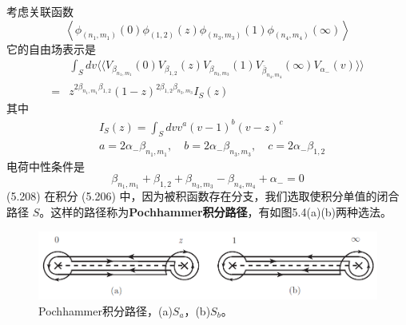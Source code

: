 考虑关联函数
\begin{equation}
	\left\langle\phi_{\left(n_{1}, m_{1}\right)}(0) \phi_{(1,2)}(z) \phi_{\left(n_{3}, m_{3}\right)}(1) \phi_{\left(n_{4}, m_{4}\right)}(\infty)\right\rangle 
\end{equation}
它的自由场表示是
\begin{equation}
	\begin{aligned} & \int_{S} d v \langle \langle V_{\beta_{n_{1}, m_{1}}}(0) V_{\beta_{1,2}}(z) V_{\beta_{n_{3}, m_{3}}}(1) V_{\bar{\beta}_{n_{4}, m_{4}}}(\infty) V_{\alpha_{-}}(v) \rangle \rangle \\ =& z^{2 \beta_{n_{1}, m_{1}} \beta_{1,2}}(1-z)^{2 \beta_{1,2} \beta_{n_{3}, m_{3}}} I_{S}(z) \end{aligned}
\end{equation} 
其中
\begin{align} &I_{S}(z)=\int_{S} d v v^{a}(v-1)^{b}(v-z)^{c}\\ &a=2 \alpha_{-} \beta_{n_{1}, m_{1}}, \quad b=2 \alpha_{-} \beta_{n_{3}, m_{3}}, \quad c=2 \alpha_{-} \beta_{1,2} \end{align}
电荷中性条件是
\begin{equation}
	\beta_{n_{1}, m_{1}}+\beta_{1,2}+\beta_{n_{3}, m_{3}}-\beta_{n_{4}, m_{4}}+\alpha_{-}=0
\end{equation} \quad \quad (5.208)
在积分 (5.206) 中，因为被积函数存在分支，我们选取使积分单值的闭合路径 $S$。这样的路径称为\textbf{Pochhammer积分路径}，有如图5.4(a)(b)两种选法。

\begin{figure}[h]
	\centering
	\includegraphics[width=0.6\linewidth]{fig/5.4.png}
	\caption{Pochhammer积分路径，(a)$S_a$，(b)$S_b$。}
\end{figure}

